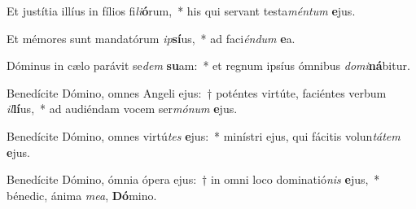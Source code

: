 \item Et justítia illíus in fílios fi\textit{li}\textbf{ó}rum,~* his qui servant testa\textit{mén}\textit{tum} \textbf{e}jus.
\item Et mémores sunt mandatórum \textit{ip}\textbf{sí}us,~* ad faci\textit{én}\textit{dum} \textbf{e}a.
\item Dóminus in cælo parávit se\textit{dem} \textbf{su}am:~* et regnum ipsíus ómnibus \textit{do}\textit{mi}\textbf{ná}bitur.
\item Benedícite Dómino, omnes Angeli ejus:~† poténtes virtúte, faciéntes verbum \textit{il}\textbf{lí}us,~* ad audiéndam vocem ser\textit{mó}\textit{num} \textbf{e}jus.
\item Benedícite Dómino, omnes virtú\textit{tes} \textbf{e}jus:~* minístri ejus, qui fácitis volun\textit{tá}\textit{tem} \textbf{e}jus.
\item Benedícite Dómino, ómnia ópera ejus:~† in omni loco dominatió\textit{nis} \textbf{e}jus,~* bénedic, ánima \textit{me}\textit{a}, \textbf{Dó}mino.
